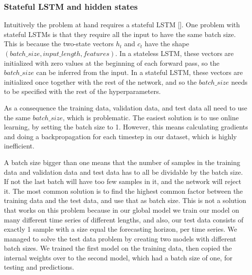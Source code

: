 \subsubsection{Stateful LSTM and hidden states}
\label{section:Method:stateful-lstm-and-hidden-states}

Intuitively the problem at hand requires a stateful LSTM [].
One problem with stateful LSTMs is that they require all the input to have the same
batch size.
This is because the two-state vectors $h_t$ and $c_t$ have the shape
$(batch\_size, input\_length, features)$. In a stateless LSTM, these
vectors are initialized with zero values at the beginning of each forward pass,
so the $batch\_size$ can be inferred from the input.
In a stateful LSTM, these vectors are initialized once together with the rest
of the network, and so the $batch\_size$ needs to be specified with
the rest of the hyperparameters.

As a consequence the training data, validation data, and test data all
need to use the same $batch\_size$, which is problematic.
The easiest solution is to use online learning, by setting the batch size to 1.
However, this means calculating gradients and doing a backpropagation for each
timestep in our dataset, which is highly inefficient.

A batch size bigger than one means that the number of samples in
the training data and validation data and test data has to all be
dividable by the batch size. If not the last batch will have too few samples in it,
and the network will reject it.
The most common solution is to find the highest common factor
between the training data and the test data, and use that as batch size.
This is not a solution that works on this problem because in our global model
we train our model on many different time series of different lengths,
and
also, our test data consists of exactly 1 sample with a size equal the
forecasting horizon, per time series.
We managed to solve the test data problem by creating two models with
different batch sizes. We trained the first model on the training data,
then copied the internal weights over to the second model, which had a
batch size of one, for testing and
predictions.

